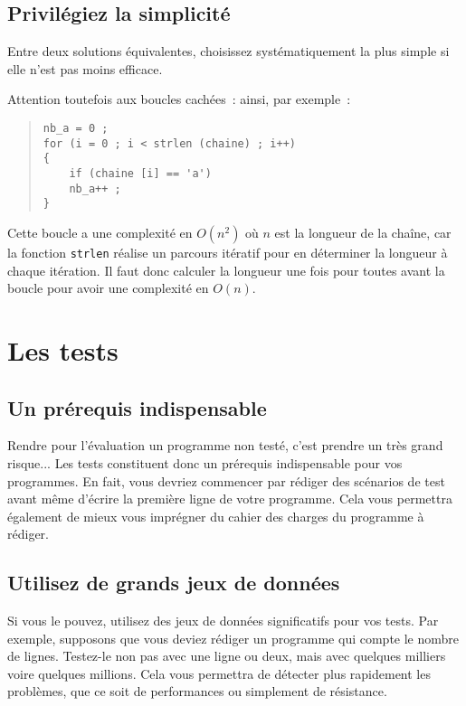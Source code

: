 \documentclass {article}
\begin{document}
\subsection {Privilégiez la simplicité}

Entre deux solutions équivalentes, choisissez systématiquement la plus
simple si elle n'est pas moins efficace.

Attention toutefois aux boucles cachées~: ainsi, par exemple~:

\begin {quote}
\begin {lstlisting}
nb_a = 0 ;
for (i = 0 ; i < strlen (chaine) ; i++)
{
    if (chaine [i] == 'a')
	nb_a++ ;
}
\end{lstlisting}
\end {quote}

Cette boucle a une complexité en $O(n^2)$ où $n$ est la longueur de la
chaîne, car la fonction \texttt {strlen} réalise un parcours itératif
pour en déterminer la longueur à chaque itération. Il faut donc
calculer la longueur une fois pour toutes avant la boucle pour avoir
une complexité en $O(n)$.


\section {Les tests}

\subsection {Un prérequis indispensable}

Rendre pour l'évaluation un programme non testé, c'est prendre un très
grand risque... Les tests constituent donc un prérequis indispensable
pour vos programmes. En fait, vous devriez commencer par rédiger des
scénarios de test avant même d'écrire la première ligne de votre
programme. Cela vous permettra également de mieux vous imprégner du
cahier des charges du programme à rédiger.

\subsection {Utilisez de grands jeux de données}

Si vous le pouvez, utilisez des jeux de données significatifs pour vos
tests. Par exemple, supposons que vous deviez rédiger un programme qui
compte le nombre de lignes. Testez-le non pas avec une ligne ou deux,
mais avec quelques milliers voire quelques millions. Cela vous permettra
de détecter plus rapidement les problèmes, que ce soit de performances
ou simplement de résistance.
\end{document}
